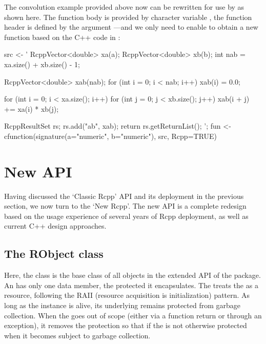 The convolution example provided above now can be rewritten for use by
 as shown here.  The function body is provided by character
variable , the function header is defined by the argument
---and we only need to enable  to obtain a
new function  based on the C++ code in :
\begin{example}
src <- '
  RcppVector<double> xa(a);
  RcppVector<double> xb(b);
  int nab = xa.size() + xb.size() - 1;

  RcppVector<double> xab(nab);
  for (int i = 0; i < nab; i++) xab(i) = 0.0;

  for (int i = 0; i < xa.size(); i++)
    for (int j = 0; j < xb.size(); j++)
       xab(i + j) += xa(i) * xb(j);

  RcppResultSet rs;
  rs.add("ab", xab);
  return rs.getReturnList();
';
fun <- cfunction(signature(a="numeric", 
                           b="numeric"),
                 src, Rcpp=TRUE)
\end{example}


\section{New  API}
\label{sec:new_rcpp}

Having discussed the `Classic Rcpp' API and its deployment in the previous
section, we now turn to the `New Rcpp'. The new API is a complete redesign
based on the usage experience of several years of Rcpp deployment, as well as
current C++ design approaches.

%


\subsection{The RObject class}

Here, the  class is the base class of all
objects in the extended API of the  package. An  has only one
data member, the protected  it encapsulates.  The 
treats the  as a resource, following the RAII (resource
acquisition is initialization) pattern. As long as the 
instance is alive, its underlying  remains protected from garbage
collection. When the  goes out of scope (either via a function
return or through an exception), it removes the protection so that if the  is not
otherwise protected when it becomes subject to garbage collection.

